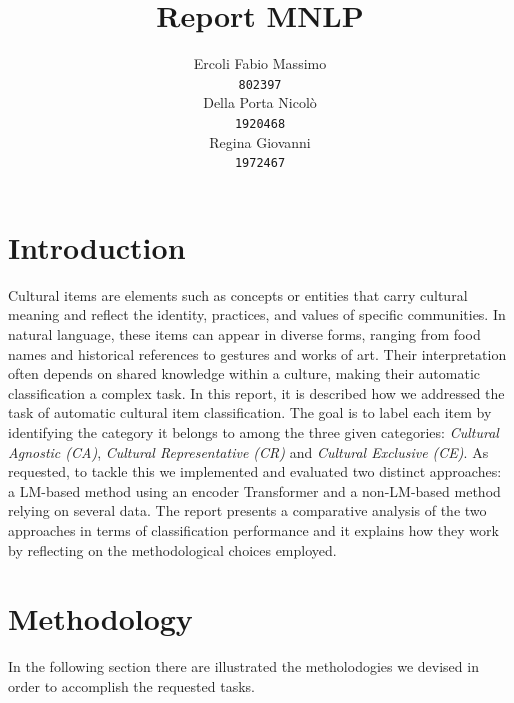 \documentclass[11pt]{article}
\title{Report MNLP}
\author{Ercoli Fabio Massimo \\
\texttt{802397} \\\And
Della Porta Nicolò \\
\texttt{1920468} \\\And
Regina Giovanni \\
\texttt{1972467} \\}
\begin{document}
\maketitle

\section{Introduction}
Cultural items are elements such as concepts or entities that carry cultural meaning and reflect the identity, practices, and values of specific communities. In natural language, these items can appear in diverse forms, ranging from food names and historical references to gestures and works of art. Their interpretation often depends on shared knowledge within a culture, making their automatic classification a complex task. \newline In this report, it is described how we addressed the task of automatic cultural item classification. The goal is to label each item by identifying the category it belongs to among the three given categories: \textit{Cultural Agnostic (CA)}, \textit{Cultural Representative (CR)} and \textit{Cultural Exclusive (CE)}. As requested, to tackle this we implemented and evaluated two distinct approaches: a LM-based method using an encoder Transformer and a non-LM-based method relying on several data. The report presents a comparative analysis of the two approaches in terms of classification performance and it explains how they work by reflecting on the methodological choices employed.

\section{Methodology}
In the following section there are illustrated the metholodogies we devised in order to accomplish the requested tasks.
\end{document}
